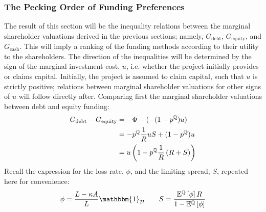 \documentclass[main.tex]{subfiles}
\begin{document}
    \subsubsection{The Pecking Order of Funding Preferences}
    \label{sec:pecking-order-theory}
        The result of this section will be the inequality relations between the marginal shareholder valuations
        derived in the previous sections; namely, $G_{\text{debt}}$, $G_{\text{equity}}$, and $G_{\text{cash}}$.
        This will imply a ranking of the funding methods according to their utility to the shareholders.
        The direction of the inequalities will be determined by the sign of the marginal investment cost, $u$,
        i.e. whether the project initially provides or claims capital. 
        Initially, the project is assumed to claim capital, such that $u$ is strictly positive;
        relations between marginal shareholder valuations for other signs of $u$ will follow directly after.
        Comparing first the marginal shareholder valuations between debt and equity funding:
            \begin{align}
                G_{\text{debt}}
                -
                G_{\text{equity}}
                &=
                    - \Phi 
                    - 
                    (
                        - (1 - p^{\mathbb{Q}})
                        u
                    )
                    \nonumber \\
                &= 
                    - p^{\mathbb{Q}}
                    \frac{1}{R}
                    u
                    S
                    +
                    (1 - p^{\mathbb{Q}})
                    u
                    \nonumber \\
                &=
                    u \left(
                        1
                        -
                        p^{\mathbb{Q}}
                        \frac{1}{R}
                        \left(
                            R
                            +
                            S
                        \right)
                    \right)
                \label{eqn:G-debt-vs-G-equity-step-1}
            \end{align}
        Recall the expression for the loss rate, $\phi$, and the limiting spread, $S$,
        repeated here for convenience:
            \begin{equation*}
                \phi 
                = 
                    \frac{
                        L - \kappa A
                    }{
                        L
                    } 
                    \mathbbm{1}_{\mathcal{D}}
                \qquad
                S 
                = 
                    \frac{
                        \mathbb{E}^{\rnmeasure}\left[\phi\right]
                        \grossrfrate
                    }{
                        1
                        -
                        \mathbb{E}^{\rnmeasure}\left[\phi\right]  
                    } 
            \end{equation*}
\end{document}
